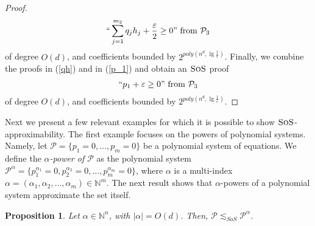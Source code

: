 \documentclass[11pt]{article}
\newcommand{\sos}{\text{\sc{SoS}}}
\newcommand{\1}{\textbf{1}}
\newtheorem{proposition}[theorem]{Proposition}
\begin{document}
\begin{proof}
    \begin{align}\label{qh}
        ``\sum_{j=1}^{m_2}q_jh_j +\frac{\varepsilon}{2} \geq 0" \text{ from }\mathcal{P}_3
    \end{align}
   of degree $O(d)$, and coefficients bounded by $2^{poly(n^d, \lg \frac{1}{\varepsilon})}$. Finally, we combine the proofs in (\ref{qh}) and in (\ref{p_1}) and obtain an $\sos$ proof
    \begin{align}\label{p_1-final}
        ``p_1 + \varepsilon \geq 0" \text{ from }\mathcal{P}_3
    \end{align}
    of degree $O(d)$, and coefficients bounded by $2^{poly(n^d, \lg \frac{1}{\varepsilon})}$.  
\end{proof}

Next we present a few relevant examples for which it is possible to show $\sos$-approximability. The first example focuses on the powers of polynomial systems. Namely, let $\mathcal{P} = \{p_1 = 0, \ldots, p_m = 0\}$ be a polynomial system of equations. We define the \emph{$\alpha$-power of $\mathcal{P}$} as the polynomial system $\mathcal{P}^{\alpha} = \{p_1^{\alpha_1} = 0, p_2^{\alpha_2} = 0, \ldots, p_m^{\alpha_m} =0\}$, where $\alpha$ is a multi-index $\alpha = (\alpha_1,\alpha_2, \ldots, \alpha_m) \in \mathbb{N}^m$. The next result shows that $\alpha$-powers of a polynomial system approximate the set itself.

\begin{proposition}\label{prop:alpha_powers}
    Let $\alpha\in \mathbb{N}^n$, with $|\alpha|=O(d)$. Then, $\mathcal P\lesssim_{SoS}\mathcal{P}^\alpha$.
\end{proposition}
\end{document}
